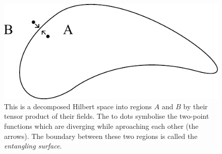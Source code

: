 %	 
	\begin{figure}[htbp]
		\begin{center}
			\includegraphics[scale=1]{entangledcorr}
			\caption{This is a decomposed Hilbert space into regions $A$ and $B$ by their tensor product of their fields. The to dots symbolise the two-point functions which are diverging while aproaching each other (the arrows). The boundary between these two regions is called the \textit{entangling surface}.} \label{entangling_surface}
		\end{center}
	\end{figure}		
\FloatBarrier